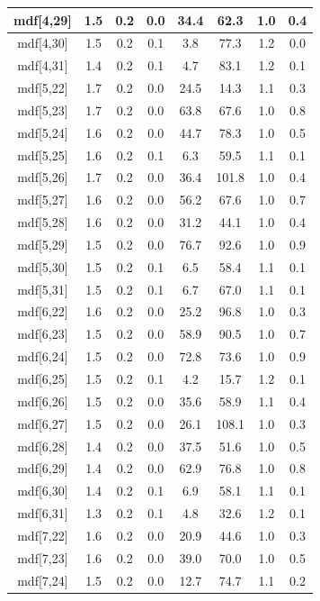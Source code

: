 \begin{longtable}{|c|c|c|c|c|c|c|c|}
mdf[4,29] & 1.5 & 0.2 & 0.0 & 34.4 & 62.3 & 1.0 & 0.4 \\
\hline
mdf[4,30] & 1.5 & 0.2 & 0.1 & 3.8 & 77.3 & 1.2 & 0.0 \\
\hline
mdf[4,31] & 1.4 & 0.2 & 0.1 & 4.7 & 83.1 & 1.2 & 0.1 \\
\hline
mdf[5,22] & 1.7 & 0.2 & 0.0 & 24.5 & 14.3 & 1.1 & 0.3 \\
\hline
mdf[5,23] & 1.7 & 0.2 & 0.0 & 63.8 & 67.6 & 1.0 & 0.8 \\
\hline
mdf[5,24] & 1.6 & 0.2 & 0.0 & 44.7 & 78.3 & 1.0 & 0.5 \\
\hline
mdf[5,25] & 1.6 & 0.2 & 0.1 & 6.3 & 59.5 & 1.1 & 0.1 \\
\hline
mdf[5,26] & 1.7 & 0.2 & 0.0 & 36.4 & 101.8 & 1.0 & 0.4 \\
\hline
mdf[5,27] & 1.6 & 0.2 & 0.0 & 56.2 & 67.6 & 1.0 & 0.7 \\
\hline
mdf[5,28] & 1.6 & 0.2 & 0.0 & 31.2 & 44.1 & 1.0 & 0.4 \\
\hline
mdf[5,29] & 1.5 & 0.2 & 0.0 & 76.7 & 92.6 & 1.0 & 0.9 \\
\hline
mdf[5,30] & 1.5 & 0.2 & 0.1 & 6.5 & 58.4 & 1.1 & 0.1 \\
\hline
mdf[5,31] & 1.5 & 0.2 & 0.1 & 6.7 & 67.0 & 1.1 & 0.1 \\
\hline
mdf[6,22] & 1.6 & 0.2 & 0.0 & 25.2 & 96.8 & 1.0 & 0.3 \\
\hline
mdf[6,23] & 1.5 & 0.2 & 0.0 & 58.9 & 90.5 & 1.0 & 0.7 \\
\hline
mdf[6,24] & 1.5 & 0.2 & 0.0 & 72.8 & 73.6 & 1.0 & 0.9 \\
\hline
mdf[6,25] & 1.5 & 0.2 & 0.1 & 4.2 & 15.7 & 1.2 & 0.1 \\
\hline
mdf[6,26] & 1.5 & 0.2 & 0.0 & 35.6 & 58.9 & 1.1 & 0.4 \\
\hline
mdf[6,27] & 1.5 & 0.2 & 0.0 & 26.1 & 108.1 & 1.0 & 0.3 \\
\hline
mdf[6,28] & 1.4 & 0.2 & 0.0 & 37.5 & 51.6 & 1.0 & 0.5 \\
\hline
mdf[6,29] & 1.4 & 0.2 & 0.0 & 62.9 & 76.8 & 1.0 & 0.8 \\
\hline
mdf[6,30] & 1.4 & 0.2 & 0.1 & 6.9 & 58.1 & 1.1 & 0.1 \\
\hline
mdf[6,31] & 1.3 & 0.2 & 0.1 & 4.8 & 32.6 & 1.2 & 0.1 \\
\hline
mdf[7,22] & 1.6 & 0.2 & 0.0 & 20.9 & 44.6 & 1.0 & 0.3 \\
\hline
mdf[7,23] & 1.6 & 0.2 & 0.0 & 39.0 & 70.0 & 1.0 & 0.5 \\
\hline
mdf[7,24] & 1.5 & 0.2 & 0.0 & 12.7 & 74.7 & 1.1 & 0.2 \\

\end{longtable}
